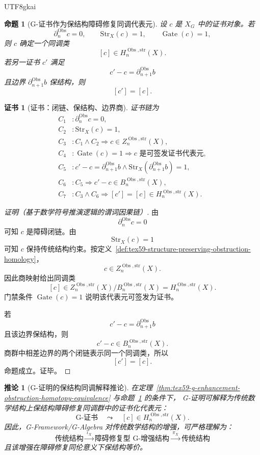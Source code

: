 \documentclass[12pt]{article}
\newtheorem{proposition}{命题}[section]
\newtheorem{corollary}{推论}[section]
\newtheorem{Certificate}{证书}[section]
\DeclareMathOperator{\Gate}{Gate}
\DeclareMathOperator{\Obs}{Obs}
\begin{document}
\begin{CJK*}{UTF8}{gkai}
\begin{proposition}[G-证书作为保结构障碍修复同调代表元]
\label{prop:tex59-certificate-as-obstruction-homology-class}
设 \(c\) 是 \(X_G\) 中的证书对象。若
\[
  \partial_n^{\Obs}c=0,
  \qquad
  \mathrm{Str}_X(c)=1,
  \qquad
  \Gate(c)=1,
\]
则 \(c\) 确定一个同调类
\[
  [c]\in H_n^{\Obs,\mathrm{str}}(X).
\]
若另一证书 \(c'\) 满足
\[
  c'-c=\partial_{n+1}^{\Obs}b
\]
且边界 \(\partial_{n+1}^{\Obs}b\) 保结构，则
\[
  [c']=[c].
\]
\end{proposition}

\begin{Certificate}[证书：闭链、保结构、边界商]
\label{cert:tex59-certificate-as-obstruction-homology-class}
证书链为
\[
\begin{aligned}
  C_1 &: \partial_n^{\Obs}c=0,\\
  C_2 &: \mathrm{Str}_X(c)=1,\\
  C_3 &: C_1\wedge C_2
         \Rightarrow c\in Z_n^{\Obs,\mathrm{str}}(X),\\
  C_4 &: \Gate(c)=1
         \Rightarrow c\text{ 是可签发证书代表元},\\
  C_5 &: c'-c=\partial_{n+1}^{\Obs}b
         \wedge
         \mathrm{Str}_X(\partial_{n+1}^{\Obs}b)=1,\\
  C_6 &: C_5
         \Rightarrow
         c'-c\in B_n^{\Obs,\mathrm{str}}(X),\\
  C_7 &: C_3\wedge C_6
         \Rightarrow
         [c']=[c]\in H_n^{\Obs,\mathrm{str}}(X).
\end{aligned}
\]
\end{Certificate}

\begin{proof}[证明（基于数学符号推演逻辑的谓词因果链）]
由
\[
  \partial_n^{\Obs}c=0
\]
可知 \(c\) 是障碍闭链。由
\[
  \mathrm{Str}_X(c)=1
\]
可知 \(c\) 保持传统结构约束。按定义~\ref{def:tex59-structure-preserving-obstruction-homology}，
\[
  c\in Z_n^{\Obs,\mathrm{str}}(X).
\]
因此商映射给出同调类
\[
  [c]\in
  Z_n^{\Obs,\mathrm{str}}(X)\big/B_n^{\Obs,\mathrm{str}}(X)
  =
  H_n^{\Obs,\mathrm{str}}(X).
\]
门禁条件 \(\Gate(c)=1\) 说明该代表元可签发为证书。

若
\[
  c'-c=\partial_{n+1}^{\Obs}b
\]
且该边界保结构，则
\[
  c'-c\in B_n^{\Obs,\mathrm{str}}(X).
\]
商群中相差边界的两个闭链表示同一个同调类，所以
\[
  [c']=[c].
\]
命题成立。证毕。
\end{proof}

\begin{corollary}[G-证明的保结构同调解释推论]
\label{cor:tex59-g-proof-structure-preserving-homology}
在定理~\ref{thm:tex59-g-enhancement-obstruction-homotopy-equivalence}
与命题~\ref{prop:tex59-certificate-as-obstruction-homology-class} 的条件下，
G-证明可解释为传统数学结构上保结构障碍修复同调群中的证书化代表元：
\[
  \text{G-证书}
  \quad\leadsto\quad
  [c]\in H_n^{\Obs,\mathrm{str}}(X).
\]
因此，G-Framework/G-Algebra 对传统数学结构的增强，可严格理解为：
\[
  \boxed{
  \text{传统结构}
  \xrightarrow{\ \iota_X\ }
  \text{障碍修复型 G-增强结构}
  \xrightarrow{\ \pi_X\ }
  \text{传统结构}
  }
\]
且该增强在障碍修复同伦意义下保结构等价。
\end{corollary}


\end{CJK*}
\end{document}
